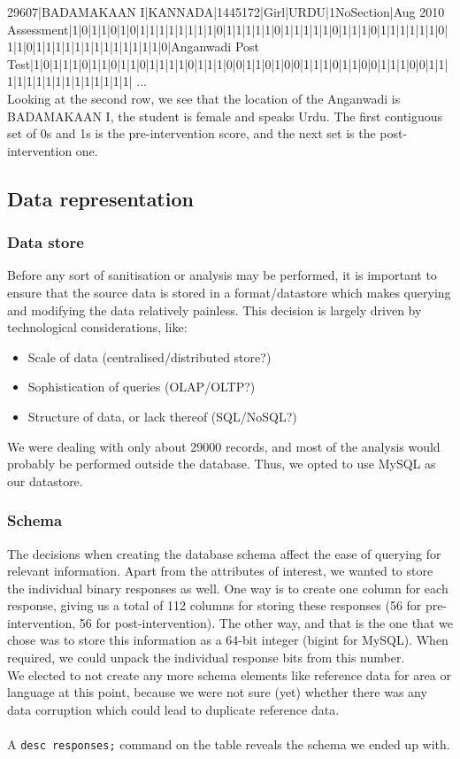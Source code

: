 \documentclass[10pt]{article}
\begin{document}
{\footnotesize 29607|BADAMAKAAN I|KANNADA|1445172|Girl|URDU|1NoSection|Aug 2010 Assessment|1|0|1|1|0|1|0|1|1|1|1|1|1|1|1|0|1|1|1|1|1|0|1|1|1|1|1|0|1|1|1|0|1|1|1|1|1|1|0|1|1|0|1|1|1|1|1|1|1|1|1|1|1|1|1|0|Anganwadi Post Test|1|0|1|1|1|0|1|1|0|1|1|0|1|1|1|1|0|1|1|1|0|0|1|1|0|1|0|0|1|1|1|0|1|1|0|0|1|1|1|0|0|1|1|1|1|1|1|1|1|1|1|1|1|1|1|1|
...
}\\

Looking at the second row, we see that the location of the Anganwadi is BADAMAKAAN I, the student is female and speaks Urdu. The first contiguous set of 0s and 1s is the pre-intervention score, and the next set is the post-intervention one.

\subsection{Data representation}
\subsubsection{Data store}
Before any sort of sanitisation or analysis may be performed, it is important to ensure that the source data is stored in a format/datastore which makes querying and modifying the data relatively painless. This decision is largely driven by technological considerations, like:

\begin{itemize}
\item Scale of data (centralised/distributed store?)
\item Sophistication of queries (OLAP/OLTP?)
\item Structure of data, or lack thereof (SQL/NoSQL?)
\end{itemize}

We were dealing with only about 29000 records, and most of the analysis would probably be performed outside the database. Thus, we opted to use MySQL as our datastore.
\subsubsection{Schema}
The decisions when creating the database schema affect the ease of querying for relevant information. Apart from the attributes of interest, we wanted to store the individual binary responses as well. One way is to create one column for each response, giving us a total of 112 columns for storing these responses (56 for pre-intervention, 56 for post-intervention). The other way, and that is the one that we chose was to store this information as a 64-bit integer (bigint for MySQL). When required, we could unpack the individual response bits from this number.\\
We elected to not create any more schema elements like reference data for area or language at this point, because we were not sure (yet) whether there was any data corruption which could lead to duplicate reference data.\\\\
A {\tt desc responses;} command on the table reveals the schema we ended up with.
\end{document}
